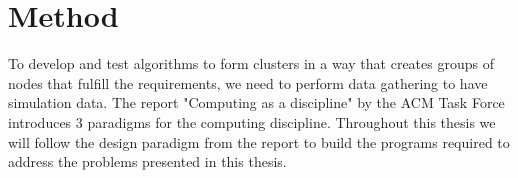 %
%

\section{Method}
To develop and test algorithms to form clusters in a way that creates groups of nodes that fulfill the requirements, we need to perform data gathering to have simulation
data. The report "Computing as a discipline" by the ACM Task Force \cite{Denning} introduces 3 paradigms for the computing discipline. Throughout this thesis we will follow the design paradigm from the report to build the programs required to address the problems presented in this thesis.

